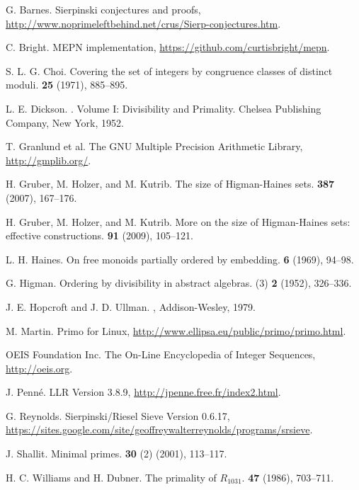 \documentclass[12pt]{article}
\theoremstyle{plain}
\theoremstyle{definition}
\newcommand{\0}{\mathtt{0}}
\newcommand{\1}{\mathtt{1}}
\newcommand{\2}{\mathtt{2}}
\newcommand{\3}{\mathtt{3}}
\newcommand{\4}{\mathtt{4}}
\newcommand{\5}{\mathtt{5}}
\newcommand{\6}{\mathtt{6}}
\newcommand{\7}{\mathtt{7}}
\newcommand{\8}{\mathtt{8}}
\newcommand{\9}{\mathtt{9}}
\begin{document}

\begin{thebibliography}{10}

  G. Barnes.
\newblock Sierpinski conjectures and proofs, \newline
\url{http://www.noprimeleftbehind.net/crus/Sierp-conjectures.htm}.

  C. Bright.
\newblock MEPN implementation,
\url{https://github.com/curtisbright/mepn}.

  S. L. G. Choi.
\newblock Covering the set of integers by congruence 
classes of distinct moduli.
 {\bf 25} (1971), 885--895.

L. E. Dickson.
.
\newblock Volume I:  Divisibility and Primality.
\newblock Chelsea Publishing Company, New York, 1952.

  T. Granlund et al.
\newblock The GNU Multiple Precision Arithmetic Library, \newline
\url{http://gmplib.org/}.

  H. Gruber, M. Holzer, and M. Kutrib.
\newblock The size of Higman-Haines sets.
 {\bf 387} (2007), 167--176.

  H. Gruber, M. Holzer, and M. Kutrib.
\newblock More on the size of Higman-Haines sets:  effective constructions.
 {\bf 91} (2009), 105--121.

  L. H. Haines.
\newblock On free monoids partially ordered by embedding.
 {\bf 6} (1969), 94--98.

  G. Higman.
\newblock Ordering by divisibility in abstract algebras.
 (3) {\bf 2} (1952), 326--336.

  J. E. Hopcroft and J. D. Ullman.
,
Addison-Wesley, 1979.

  M. Martin.
\newblock Primo for Linux,
\url{http://www.ellipsa.eu/public/primo/primo.html}.

 OEIS Foundation Inc.
\newblock The On-Line Encyclopedia of Integer Sequences,
\url{http://oeis.org}.

  J. Penn\'e.
\newblock LLR Version 3.8.9,
\url{http://jpenne.free.fr/index2.html}.

  G. Reynolds.
\newblock Sierpinski/Riesel Sieve Version 0.6.17, \newline
\url{https://sites.google.com/site/geoffreywalterreynolds/programs/srsieve}.

  J. Shallit.
\newblock Minimal primes.
 {\bf 30} (2) (2001), 113--117.

  H. C. Williams and H. Dubner.
\newblock The primality of $R_{1031}$.
 {\bf 47} (1986), 703--711.

\end{thebibliography}
\end{document}
